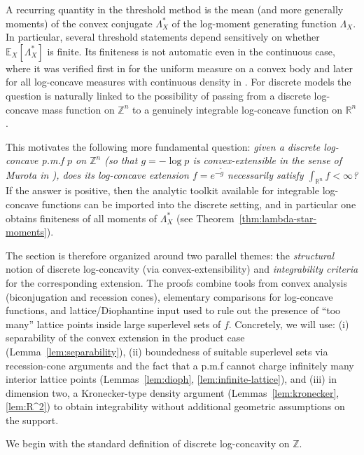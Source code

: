 \documentclass[11pt,a4paper]{article} %
\theoremstyle{definition}
\theoremstyle{remark}
\newcommand{\R}{\mathbb{R}}
\newcommand{\E}{\mathbb{E}}
\newcommand{\Z}{\mathbb{Z}}
\newcommand{\1}{\mathds{1}}
\begin{document}
A recurring quantity in the threshold method is the mean (and more generally moments) of the convex
conjugate $\Lambda_X^\ast$ of the log-moment generating function $\Lambda_X$.
In particular, several threshold statements depend sensitively on whether $\E_X[\Lambda_X^\ast]$
is finite. Its finiteness is not automatic even in the continuous case, where it was verified first in \cite{BGP} for the uniform measure on a convex body and later for all log-concave measures with continuous density in \cite{Giannop-Tziotziou}.
For discrete models the question is naturally
linked to the possibility of passing from a discrete log-concave mass function on $\Z^n$
to a genuinely integrable log-concave function on $\R^n$.

\smallskip

This motivates the following more fundamental question:
\emph{given a discrete log-concave p.m.f $p$ on $\Z^n$ {\rm (}so that
$g=-\log p$ is convex-extensible in the sense of Murota in {\rm \cite{Mur})}, does its log-concave extension
$f=e^{-\tilde g}$ necessarily satisfy $\int_{\R^n} f<\infty$?}
If the answer is positive, then the analytic toolkit available for integrable log-concave functions
can be imported into the discrete setting, and in particular one obtains finiteness of all moments
of $\Lambda_X^\ast$ (see Theorem~\ref{thm:lambda-star-moments}).

\smallskip

The section is therefore organized around two parallel themes: the \emph{structural} notion of
discrete log-concavity (via convex-extensibility) and \emph{integrability criteria} for the
corresponding extension.
The proofs combine tools from convex analysis (biconjugation and recession cones),
elementary comparisons for log-concave functions, and lattice/Diophantine input used to rule out
the presence of ``too many'' lattice points inside large superlevel sets of $f$.
Concretely, we will use:
(i) separability of the convex extension in the product case (Lemma~\ref{lem:separability}),
(ii) boundedness of suitable superlevel sets via recession-cone arguments and the fact that a p.m.f
cannot charge infinitely many interior lattice points (Lemmas~\ref{lem:dioph}, \ref{lem:infinite-lattice}),
and (iii) in dimension two, a Kronecker-type density argument (Lemmas~\ref{lem:kronecker}, \ref{lem:R^2})
to obtain integrability without additional geometric assumptions on the support.
 
We begin with the standard definition of discrete log-concavity on $\mathbb{Z}$.
\end{document}
